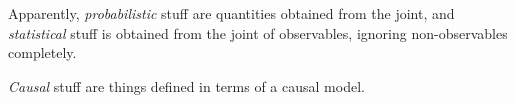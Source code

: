 Apparently, \textit{probabilistic} stuff are quantities obtained from the joint, and \textit{statistical} stuff is obtained from the joint of observables, ignoring non-observables completely.

\textit{Causal} stuff are things defined in terms of a causal model.



